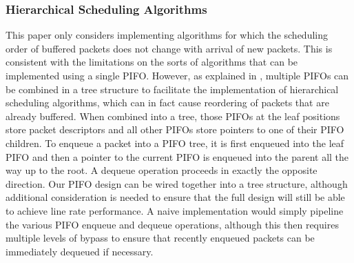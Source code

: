 \subsubsection*{Hierarchical Scheduling Algorithms}
This paper only considers implementing algorithms for which the scheduling order of buffered packets does not change with arrival of new packets. This is consistent with the limitations on the sorts of algorithms that can be implemented using a single PIFO. However, as explained in \cite{pifo2016}, multiple PIFOs can be combined in a tree structure to facilitate the implementation of hierarchical scheduling algorithms, which can in fact cause reordering of packets that are already buffered. When combined into a tree, those PIFOs at the leaf positions store packet descriptors and all other PIFOs store pointers to one of their PIFO children. To enqueue a packet into a PIFO tree, it is first enqueued into the leaf PIFO and then a pointer to the current PIFO is enqueued into the parent all the way up to the root. A dequeue operation proceeds in exactly the opposite direction. Our PIFO design can be wired together into a tree structure, although additional consideration is needed to ensure that the full design will still be able to achieve line rate performance. A naive implementation would simply pipeline the various PIFO enqueue and dequeue operations, although this then requires multiple levels of bypass to ensure that recently enqueued packets can be immediately dequeued if necessary.



